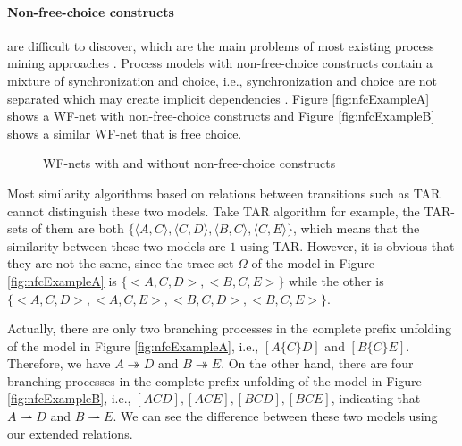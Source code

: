 \documentclass[dvips,...]{llncs}
\begin{document}
\paragraph{Non-free-choice constructs}\label{par:nfc} 
are difficult to discover, which are the main problems of most existing process mining approaches \cite{de2003workflow}. Process models with non-free-choice constructs contain a mixture of synchronization and choice, i.e., synchronization and choice are not separated which may create implicit dependencies \cite{wen2007mining}. Figure \ref{fig:nfcExampleA} shows a WF-net with non-free-choice constructs and Figure \ref{fig:nfcExampleB} shows a similar WF-net that is free choice.

\begin{figure}[htbp]
\centering
{}
\hspace{0.5cm}
\caption{WF-nets with and without non-free-choice constructs\label{fig:nfcExample}}
\end{figure}

Most similarity algorithms based on relations between transitions such as TAR cannot distinguish these two models. Take TAR algorithm for example, the TAR-sets of them are both $\{\langle A,C\rangle, \langle C,D\rangle, \langle B,C\rangle, \langle C,E\rangle\}$, which means that the similarity between these two models are $1$ using TAR. However, it is obvious that they are not the same, since the trace set $\Omega$ of the model in Figure \ref{fig:nfcExampleA} is $\{<A,C,D>,<B,C,E>\}$ while the other is $\{<A,C,D>,<A,C,E>,<B,C,D>,<B,C,E>\}$.

Actually, there are only two branching processes in the complete prefix unfolding of the model in Figure \ref{fig:nfcExampleA}, i.e., $[A\{C\}D]$ and $[B\{C\}E]$. Therefore, we have $A\twoheadrightarrow D$ and $B\twoheadrightarrow E$. On the other hand, there are four branching processes in the complete prefix unfolding of the model in Figure \ref{fig:nfcExampleB}, i.e., $[ACD],[ACE],[BCD],[BCE]$, indicating that $A\rightharpoonup D$ and $B\rightharpoonup E$. We can see the difference between these two models using our extended relations.
\end{document}
